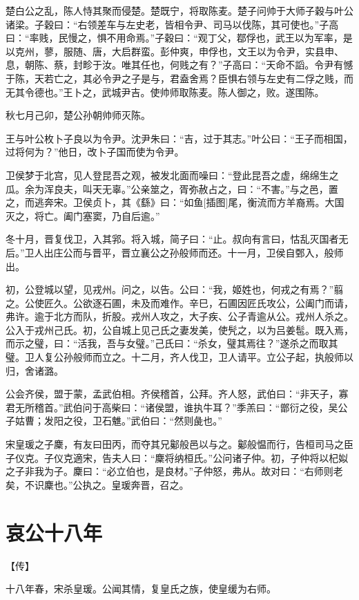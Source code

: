 \documentclass[a4paper,12pt,UTF8,twoside]{ctexbook}
\begin{document}
楚白公之乱，陈人恃其聚而侵楚。楚既宁，将取陈麦。楚子问帅于大师子穀与叶公诸梁。子穀曰：“右领差车与左史老，皆相令尹、司马以伐陈，其可使也。”子高曰：“率贱，民慢之，惧不用命焉。”子穀曰：“观丁父，鄀俘也，武王以为军率，是以克州，蓼，服随、唐，大启群蛮。彭仲爽，申俘也，文王以为令尹，实县申、息，朝陈、蔡，封畛于汝。唯其任也，何贱之有？”子高曰：“天命不謟。令尹有憾于陈，天若亡之，其必令尹之子是与，君盍舍焉？臣惧右领与左史有二俘之贱，而无其令德也。”王卜之，武城尹吉。使帅师取陈麦。陈人御之，败。遂围陈。

秋七月己卯，楚公孙朝帅师灭陈。

王与叶公枚卜子良以为令尹。沈尹朱曰：“吉，过于其志。”叶公曰：“王子而相国，过将何为？”他日，改卜子国而使为令尹。

卫侯梦于北宫，见人登昆吾之观，被发北面而噪曰：“登此昆吾之虚，绵绵生之瓜。余为浑良夫，叫天无辜。”公亲筮之，胥弥赦占之，曰：“不害。”与之邑，置之，而逃奔宋。卫侯贞卜，其《繇》曰：“如鱼[插图]尾，衡流而方羊裔焉。大国灭之，将亡。阖门塞窦，乃自后逾。”

冬十月，晋复伐卫，入其郛。将入城，简子曰：“止。叔向有言曰，怙乱灭国者无后。”卫人出庄公而与晋平，晋立襄公之孙般师而还。十一月，卫侯自鄄入，般师出。

初，公登城以望，见戎州。问之，以告。公曰：“我，姬姓也，何戎之有焉？”翦之。公使匠久。公欲逐石圃，未及而难作。辛巳，石圃因匠氏攻公，公阖门而请，弗许。逾于北方而队，折股。戎州人攻之，大子疾、公子青逾从公。戎州人杀之。公入于戎州己氏。初，公自城上见己氏之妻发美，使髠之，以为吕姜髢。既入焉，而示之璧，曰：“活我，吾与女璧。”己氏曰：“杀女，璧其焉往？”遂杀之而取其璧。卫人复公孙般师而立之。十二月，齐人伐卫，卫人请平。立公子起，执般师以归，舍诸潞。

公会齐侯，盟于蒙，孟武伯相。齐侯稽首，公拜。齐人怒，武伯曰：“非天子，寡君无所稽首。”武伯问于高柴曰：“诸侯盟，谁执牛耳？”季羔曰：“鄫衍之役，吴公子姑曹；发阳之役，卫石魋。”武伯曰：“然则彘也。”

宋皇瑗之子麇，有友曰田丙，而夺其兄酁般邑以与之。酁般愠而行，告桓司马之臣子仪克。子仪克適宋，告夫人曰：“麇将纳桓氏。”公问诸子仲。初，子仲将以杞姒之子非我为子。麇曰：“必立伯也，是良材。”子仲怒，弗从。故对曰：“右师则老矣，不识麇也。”公执之。皇瑗奔晋，召之。


\chapter{哀公十八年}



【传】

十八年春，宋杀皇瑗。公闻其情，复皇氏之族，使皇缓为右师。
\end{document}
